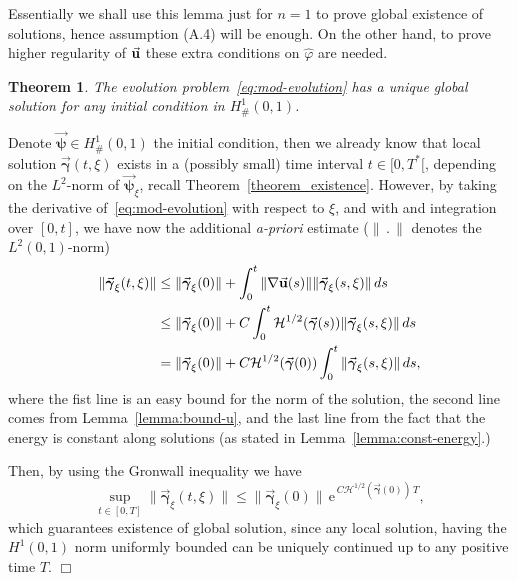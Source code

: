 \documentclass[a4paper,11pt]{article}
\numberwithin{equation}{section}
\newtheorem{theorem}{Theorem}
\newenvironment{proof}[1][Proof]{{\sc #1.} }{\hfill $\Box$}
\newcommand{\U}{\mbox{$\vec{\bf u}$}}
\newcommand{\bgamma}{\mbox{$\vec{\boldsymbol \gamma}$}}
\begin{document}
\vspace{.2cm}
Essentially we shall use this lemma just for $n=1$ to prove global
existence of solutions, hence assumption (A.4) will be enough. On the
other hand, to prove higher regularity of $\U$ these extra
conditions on $\widehat{\varphi}$ are needed.  
\vspace{.2cm}
%
%
\begin{theorem}
The evolution problem~\eqref{eq:mod-evolution} has a unique global
solution for any initial condition in $H^1_\#(0,1)$.
\end{theorem}
\begin{proof}
Denote $\vec{\boldsymbol\psi} \in H^1_\#(0,1)$ the initial condition,
then we already know that local solution $\bgamma(t,\xi)$ exists in a
(possibly small) time interval $t \in[0,T^*[$, depending on the
    $L^2$-norm of $\vec{\boldsymbol\psi}_\xi$, recall
Theorem~\ref{theorem_existence}. However, by taking the derivative
of~\eqref{eq:mod-evolution} with respect to $\xi$, and with and
integration over $[0,t]$, we have now the additional \textit{a-priori}
estimate ($\|\,.\,\|$ denotes the $L^2(0,1)$-norm) 
\begin{equation*}%
  \begin{aligned}
\|\bgamma_\xi(t,\xi)\| & \le \|\bgamma_\xi(0)\| + \int_0^t \|\nabla
\U(s)\| \|\bgamma_\xi(s,\xi)\|\, ds \\ 
& \le \|\bgamma_\xi(0)\| + C\int_0^t \mathcal{H}^{1/2}(\bgamma(s))
\|\bgamma_\xi(s,\xi)\|\, ds \\ 
& = \|\bgamma_\xi(0)\| + C \mathcal{H}^{1/2}(\bgamma(0)) \int_0^t
\|\bgamma_\xi(s,\xi)\|\, ds,
  \end{aligned}
\end{equation*}
where the fist line is an easy bound for the norm of the solution, the
second line comes from Lemma~\ref{lemma:bound-u}, and the last line
from the fact that the energy is constant along solutions (as stated
in Lemma~\ref{lemma:const-energy}.)\par 
%
Then, by using the Gronwall inequality we have
$$ 
\sup_{t \in [0,T]}\|\bgamma_\xi(t,\xi)\| \le \|\bgamma_\xi(0)\|\,
\text{e}^{\,C \mathcal{H}^{1/2}(\bgamma(0))\,T},
$$
which guarantees existence of global solution, since any local
solution, having the $H^1(0,1)$ norm uniformly bounded can be uniquely 
continued up to any positive time $T$.
\end{proof}


\vspace{.2cm}
%
\end{document}
